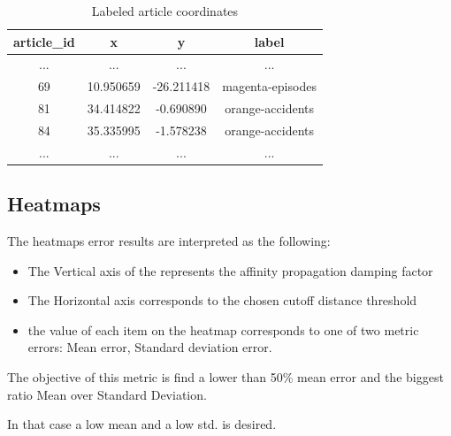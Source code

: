 \documentclass[ecp,tc,english]{iiufrgs}
\begin{document}
        \begin{table}[!ht]
            \centering
            \begin{tabular}{ |c|c|c|c| } 
                \hline
                article\_id & x & y & label \\
                \hline 
                ... & ... & ... & ... \\
                69 & 10.950659 & -26.211418 & magenta-episodes \\ 
                81 & 34.414822 & -0.690890 & orange-accidents \\ 
                84 & 35.335995 & -1.578238 & orange-accidents \\ 
                ... & ... & ... & ... \\
                \hline
            \end{tabular}
            \caption{Labeled article coordinates}
            \label{tab:my_label}
        \end{table}
        
        \newpage 

        \subsection{Heatmaps}
    
        The heatmaps error results are interpreted as the following:
        \begin{itemize}
            \item The Vertical axis of the represents the affinity propagation damping factor
            \item The Horizontal axis corresponds to the chosen cutoff distance threshold
            \item the value of each item on the heatmap corresponds to one of two metric errors: Mean error, Standard deviation error.
        \end{itemize}
    
        The objective of this metric is find a lower than 50\% mean error and the biggest ratio Mean over Standard Deviation. 
    
        In that case a low mean and a low std. is desired.
        
\end{document}
